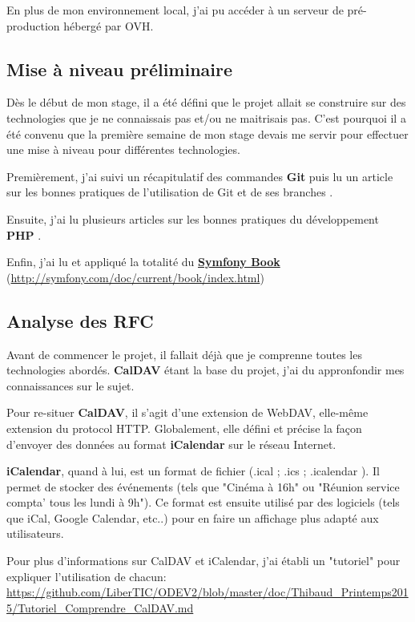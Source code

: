 En plus de mon environnement local, j'ai pu accéder à un serveur de pré-production hébergé par OVH.

\subsection{Mise à niveau préliminaire}

Dès le début de mon stage, il a été défini que le projet allait se construire sur des technologies que je ne connaissais pas et/ou ne maitrisais pas. C'est pourquoi il a été convenu que la première semaine de mon stage devais me servir pour effectuer une mise à niveau pour différentes technologies.

Premièrement, j'ai suivi un récapitulatif des commandes \textbf{Git} \cite{gitimmersion} puis lu un article sur les bonnes pratiques de l'utilisation de Git et de ses branches \cite{successfulgit}.

Ensuite, j'ai lu plusieurs articles sur les bonnes pratiques du développement \textbf{PHP} \cite{bestpracticephp} \cite{stupidvssolid}.

Enfin, j'ai lu et appliqué la totalité du \href{http://symfony.com/doc/current/book/index.html}{\textbf{Symfony Book}} (\url{http://symfony.com/doc/current/book/index.html})

\subsection{Analyse des RFC}

Avant de commencer le projet, il fallait déjà que je comprenne toutes les technologies abordés. \textbf{CalDAV} étant la base du projet, j'ai du appronfondir mes connaissances sur le sujet.

Pour re-situer \textbf{CalDAV}, il s'agit d'une extension de WebDAV, elle-même extension du protocol HTTP. Globalement, elle défini et précise la façon d'envoyer des données au format \textbf{iCalendar} sur le réseau Internet.

\textbf{iCalendar}, quand à lui, est un format de fichier (.ical ; .ics ; .icalendar ). Il permet de stocker des événements (tels que "Cinéma à 16h" ou "Réunion service compta' tous les lundi à 9h"). Ce format est ensuite utilisé par des logiciels (tels que iCal, Google Calendar, etc..) pour en faire un affichage plus adapté aux utilisateurs.

Pour plus d'informations sur CalDAV et iCalendar, j'ai établi un "tutoriel" pour expliquer l'utilisation de chacun: \url{https://github.com/LiberTIC/ODEV2/blob/master/doc/Thibaud_Printemps2015/Tutoriel_Comprendre_CalDAV.md}

